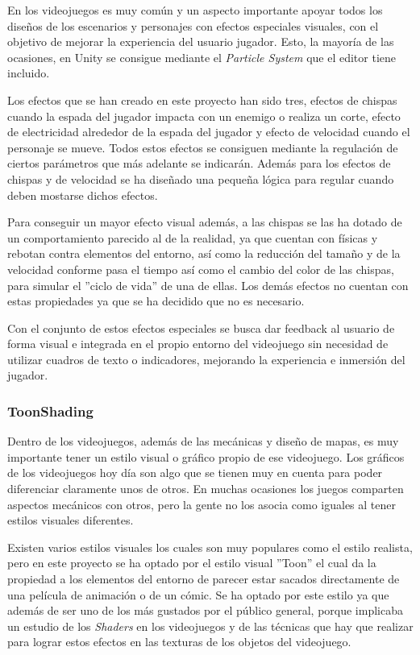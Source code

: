 En los videojuegos es muy común y un aspecto importante apoyar todos los diseños de los escenarios y personajes con efectos especiales visuales, con el objetivo de mejorar la experiencia del usuario jugador. Esto, la mayoría de las ocasiones, en Unity se consigue mediante el \textit{Particle System} \cite{ParticleSystem} que el editor tiene incluido.

Los efectos que se han creado en este proyecto han sido tres, efectos de chispas cuando la espada del jugador impacta con un enemigo o realiza un corte, efecto de electricidad alrededor de la espada del jugador y efecto de velocidad cuando el personaje se mueve. Todos estos efectos se consiguen mediante la regulación de ciertos parámetros que más adelante se indicarán. Además para los efectos de chispas y de velocidad se ha diseñado una pequeña lógica para regular cuando deben mostarse dichos efectos.

Para conseguir un mayor efecto visual además, a las chispas se las ha dotado de un comportamiento parecido al de la realidad, ya que cuentan con físicas y rebotan contra elementos del entorno, así como la reducción del tamaño y de la velocidad conforme pasa el tiempo así como el cambio del color de las chispas, para simular el ''ciclo de vida'' de una de ellas. Los demás efectos no cuentan con estas propiedades ya que se ha decidido que no es necesario.

Con el conjunto de estos efectos especiales se busca dar feedback al usuario de forma visual e integrada en el propio entorno del videojuego sin necesidad de utilizar cuadros de texto o indicadores, mejorando la experiencia e inmersión del jugador.

\subsubsection{ToonShading}

Dentro de los videojuegos, además de las mecánicas y diseño de mapas, es muy importante tener un estilo visual o gráfico propio de ese videojuego. Los gráficos de los videojuegos hoy día son algo que se tienen muy en cuenta para poder diferenciar claramente unos de otros. En muchas ocasiones los juegos comparten aspectos mecánicos con otros, pero la gente no los asocia como iguales al tener estilos visuales diferentes. 

Existen varios estilos visuales los cuales son muy populares como el estilo realista, pero en este proyecto se ha optado por el estilo visual ''Toon'' el cual da la propiedad a los elementos del entorno de parecer estar sacados directamente de una película de animación o de un cómic. Se ha optado por este estilo ya que además de ser uno de los más gustados por el público general, porque implicaba un estudio de los \textit{Shaders} en los videojuegos y de las técnicas que hay que realizar para lograr estos efectos en las texturas de los objetos del videojuego.

